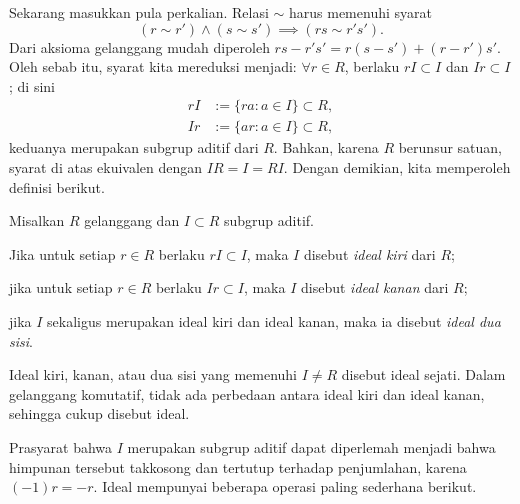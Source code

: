 Sekarang masukkan pula perkalian. Relasi $\sim$ harus memenuhi syarat
\[ (r \sim r') \wedge (s \sim s') \implies (rs \sim r's'). \]
Dari aksioma gelanggang mudah diperoleh $rs - r's' = r(s-s') + (r-r')s'$. Oleh sebab itu, syarat kita mereduksi menjadi: $\forall r \in R$, berlaku $rI \subset I$ dan $Ir \subset I$; di sini
\begin{align*}
	rI & := \{ra : a \in I\} \subset R, \\
	Ir & := \{ar : a \in I\} \subset R,
\end{align*}
keduanya merupakan subgrup aditif dari $R$. Bahkan, karena $R$ berunsur satuan, syarat di atas ekuivalen dengan $IR = I = RI$. Dengan demikian, kita memperoleh definisi berikut.

\begin{definition}\label{def:ideals}
	Misalkan $R$ gelanggang dan $I \subset R$ subgrup aditif.
	\begin{compactenum}[(i)]
		\item Jika untuk setiap $r \in R$ berlaku $rI \subset I$, maka $I$ disebut \emph{ideal kiri} dari $R$;
		\item jika untuk setiap $r \in R$ berlaku $Ir \subset I$, maka $I$ disebut \emph{ideal kanan} dari $R$;
		\item jika $I$ sekaligus merupakan ideal kiri dan ideal kanan, maka ia disebut \emph{ideal dua sisi}.
	\end{compactenum}
	Ideal kiri, kanan, atau dua sisi yang memenuhi $I \neq R$ disebut ideal sejati. Dalam gelanggang komutatif, tidak ada perbedaan antara ideal kiri dan ideal kanan, sehingga cukup disebut ideal.
\end{definition}
Prasyarat bahwa $I$ merupakan subgrup aditif dapat diperlemah menjadi bahwa himpunan tersebut takkosong dan tertutup terhadap penjumlahan, karena $(-1)r = -r$. Ideal mempunyai beberapa operasi paling sederhana berikut.
